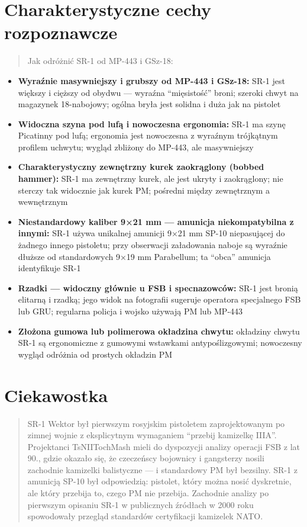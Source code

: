 \documentclass[12pt,openany,oneside]{book}
\providecommand{\tightlist}{%
  \setlength{\itemsep}{0pt}\setlength{\parskip}{0pt}}
\begin{document}
\section{Charakterystyczne cechy
rozpoznawcze}\label{charakterystyczne-cechy-rozpoznawcze-93}

\begin{quote}
Jak odróżnić SR-1 od MP-443 i GSz-18:
\end{quote}

\begin{itemize}
\tightlist
\item
  \textbf{Wyraźnie masywniejszy i grubszy od MP-443 i GSz-18:} SR-1 jest
  większy i cięższy od obydwu --- wyraźna ``mięsistość'' broni; szeroki
  chwyt na magazynek 18-nabojowy; ogólna bryła jest solidna i duża jak
  na pistolet
\item
  \textbf{Widoczna szyna pod lufą i nowoczesna ergonomia:} SR-1 ma szynę
  Picatinny pod lufą; ergonomia jest nowoczesna z wyraźnym trójkątnym
  profilem uchwytu; wygląd zbliżony do MP-443, ale masywniejszy
\item
  \textbf{Charakterystyczny zewnętrzny kurek zaokrąglony (bobbed
  hammer):} SR-1 ma zewnętrzny kurek, ale jest ukryty i zaokrąglony; nie
  sterczy tak widocznie jak kurek PM; pośredni między zewnętrznym a
  wewnętrznym
\item
  \textbf{Niestandardowy kaliber 9×21 mm --- amunicja niekompatybilna z
  innymi:} SR-1 używa unikalnej amunicji 9×21 mm SP-10 niepasującej do
  żadnego innego pistoletu; przy obserwacji załadowania naboje są
  wyraźnie dłuższe od standardowych 9×19 mm Parabellum; ta ``obca''
  amunicja identyfikuje SR-1
\item
  \textbf{Rzadki --- widoczny głównie u FSB i specnazowców:} SR-1 jest
  bronią elitarną i rzadką; jego widok na fotografii sugeruje operatora
  specjalnego FSB lub GRU; regularna policja i wojsko używają PM lub
  MP-443
\item
  \textbf{Złożona gumowa lub polimerowa okładzina chwytu:} okładziny
  chwytu SR-1 są ergonomiczne z gumowymi wstawkami antypoślizgowymi;
  nowoczesny wygląd odróżnia od prostych okładzin PM
\end{itemize}

\section{Ciekawostka}\label{ciekawostka-93}

\begin{quote}
SR-1 Wektor był pierwszym rosyjskim pistoletem zaprojektowanym po zimnej
wojnie z eksplicytnym wymaganiem ``przebij kamizelkę IIIA''. Projektanci
TsNIITochMash mieli do dyspozycji analizy operacji FSB z lat 90., gdzie
okazało się, że czeczeńscy bojownicy i gangsterzy nosili zachodnie
kamizelki balistyczne --- i standardowy PM był bezsilny. SR-1 z amunicją
SP-10 był odpowiedzią: pistolet, który można nosić dyskretnie, ale który
przebija to, czego PM nie przebija. Zachodnie analizy po pierwszym
opisaniu SR-1 w publicznych źródłach w 2000 roku spowodowały przegląd
standardów certyfikacji kamizelek NATO.
\end{quote}
\end{document}
